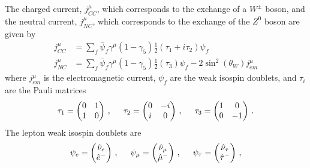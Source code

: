   The charged current, $j^{\mu}_{CC}$, which corresponds to the exchange of a
  $W^{\pm}$ boson, and the neutral current, $j^{\mu}_{NC}$, which corresponds
  to the exchange of the $Z^0$ boson are given by~\cite{Paschos:2007pi}
  \begin{align}\label{eq:ccurrent}
      j^{\mu}_{CC} &= \sum_f \bar{\psi}_f \gamma^{\mu} (1-\gamma_5) \frac{1}{2}(\tau_1 + i\tau_2) \psi_f \\
        \label{eq:ncurrent}
      j^{\mu}_{NC} &= \sum_f \bar{\psi}_f \gamma^{\mu} (1-\gamma_5) \frac{1}{2}(\tau_3) \psi_f 
       - 2\sin^2(\theta_W) j^{\mu}_{em}
  \end{align}
  where $j^{\mu}_{em}$ is the electromagnetic current, $\psi_{f}$ are the weak
  isospin doublets, and $\tau_i$ are the Pauli matrices
  \begin{equation}
      \tau_1 = 
      \begin{pmatrix}
        0 & 1 \\
        1 & 0
      \end{pmatrix} \,,
      \hspace{5mm}
      \tau_2 = 
      \begin{pmatrix}
        0 & -i \\
        i & 0
      \end{pmatrix} \,,
      \hspace{5mm}
      \tau_3 = 
      \begin{pmatrix}
        1 & 0 \\
        0 & -1
      \end{pmatrix} \,.
  \end{equation}
  The lepton weak isospin doublets are~\cite{Paschos:2007pi}
  \begin{equation}
    \psi_{e} = 
    \begin{pmatrix}
        \hat{\nu}_{e} \\
        \hat{e}^-
    \end{pmatrix} \,,
      \hspace{5mm}
    \psi_{\mu} = 
    \begin{pmatrix}
        \hat{\nu}_{\mu} \\
        \hat{\mu}^-
    \end{pmatrix} \,,
      \hspace{5mm}
    \psi_{\tau} = 
    \begin{pmatrix}
        \hat{\nu}_{\tau} \\
        \hat{\tau}^-
    \end{pmatrix} \,,
  \end{equation}
